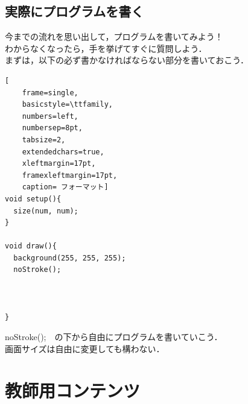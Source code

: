 \documentclass[a4j]{jarticle}
\begin{document}
\newpage

\subsection{実際にプログラムを書く}
今までの流れを思い出して，プログラムを書いてみよう！\\
わからなくなったら，手を挙げてすぐに質問しよう．\\
まずは，以下の必ず書かなければならない部分を書いておこう．
\begin{lstlisting}[
	frame=single, 
	basicstyle=\ttfamily, 
	numbers=left, 
	numbersep=8pt, 
	tabsize=2,
	extendedchars=true, 
	xleftmargin=17pt, 
	framexleftmargin=17pt, 
	caption= フォーマット]
void setup(){
  size(num, num); 
}

void draw(){
  background(255, 255, 255);
  noStroke();
  


}
\end{lstlisting}
noStroke();　の下から自由にプログラムを書いていこう．\\
画面サイズは自由に変更しても構わない．
\newpage
\section{教師用コンテンツ}
\end{document}

